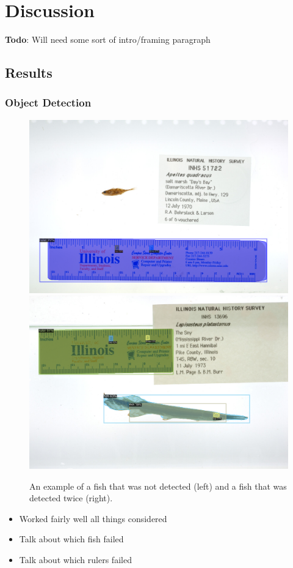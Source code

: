 \documentclass[conference]{IEEEtran}
\begin{document}
\section{Discussion}
\textbf{Todo}: Will need some sort of intro/framing paragraph
\subsection{Results}
\subsubsection{Object Detection}
\begin{figure}[H]
  \centering
  \includegraphics[width=0.49\linewidth]{images/none1}
  \includegraphics[width=0.49\linewidth]{images/double1}
  \caption{An example of a fish that was not detected (left) and a fish that was detected twice (right).}
\end{figure}

\begin{itemize}
    \item Worked fairly well all things considered
    \item Talk about which fish failed
    \item Talk about which rulers failed
\end{itemize}
\end{document}
